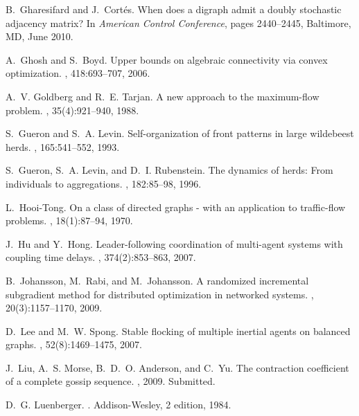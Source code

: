 \documentclass[final]{siamltex}
\begin{document}
\begin{thebibliography}{10}
B.~Gharesifard and J.~Cort\'es.
\newblock When does a digraph admit a doubly stochastic adjacency matrix?
\newblock In {\em {A}merican {C}ontrol {C}onference}, pages 2440--2445,
  Baltimore, MD, June 2010.

A.~Ghosh and S.~Boyd.
\newblock Upper bounds on algebraic connectivity via convex optimization.
, 418:693--707, 2006.

A.~V. Goldberg and R.~E. Tarjan.
\newblock A new approach to the maximum-flow problem.
,
  35(4):921--940, 1988.

S.~Gueron and S.~A. Levin.
\newblock Self-organization of front patterns in large wildebeest herds.
, 165:541--552, 1993.

S.~Gueron, S.~A. Levin, and D.~I. Rubenstein.
\newblock The dynamics of herds: From individuals to aggregations.
, 182:85--98, 1996.

L.~Hooi-Tong.
\newblock On a class of directed graphs - with an application to traffic-flow
  problems.
, 18(1):87--94, 1970.

J.~Hu and Y.~Hong.
\newblock Leader-following coordination of multi-agent systems with coupling
  time delays.
, 374(2):853--863, 2007.

B.~Johansson, M.~Rabi, and M.~Johansson.
\newblock A randomized incremental subgradient method for distributed
  optimization in networked systems.
, 20(3):1157--1170,
  2009.

D.~Lee and M.~W. Spong.
\newblock Stable flocking of multiple inertial agents on balanced graphs.
, 52(8):1469--1475, 2007.

J.~Liu, A.~S. Morse, B.~D.~O. Anderson, and C.~Yu.
\newblock The contraction coefficient of a complete gossip sequence.
, 2009.
\newblock Submitted.

D.~G. Luenberger.
.
\newblock Addison-Wesley, 2 edition, 1984.


\end{thebibliography}
\end{document}
